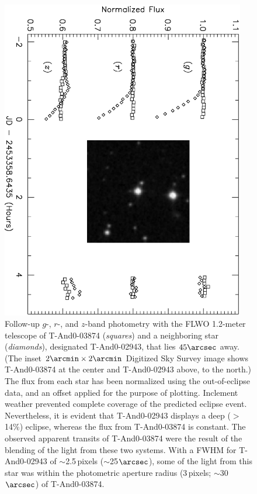 \begin{figure}
\begin{center}
\includegraphics[angle=90, width=0.95\textwidth]{2_f6}
\caption[Follow-up photometry of \mbox{T-And0-03874}, a blended eclipsing binary]{
Follow-up $g$-, $r$-, and $z$-band photometry with the FLWO 1.2-meter telescope of \mbox{T-And0-03874} (\textit{squares}) and a neighboring star (\textit{diamonds}), designated \mbox{T-And0-02943}, that lies $45\arcsec$ away. (The inset $2\arcmin \times 2\arcmin$ Digitized Sky Survey image shows \mbox{T-And0-03874} at the center and \mbox{T-And0-02943} above, to the north.) %
The flux from each star has been normalized using the out-of-eclipse data, and an offset  applied for the purpose of plotting. Inclement weather prevented complete coverage of the predicted eclipse event. Nevertheless, it is evident that \mbox{T-And0-02943} displays a deep ($>$14\%) eclipse, whereas the flux from \mbox{T-And0-03874} is constant. The observed apparent transits of \mbox{T-And0-03874} were the result of the blending of the light from these two systems. With a FWHM for \mbox{T-And0-02943} of $\sim$2.5\,pixels ($\sim$25$\arcsec$), some of the light from this star was within the photometric aperture radius ($3$\,pixels; $\sim$30$\arcsec$) of \mbox{T-And0-03874}.}\label{cha:and0:fig:blend}
\end{center}
\end{figure}

